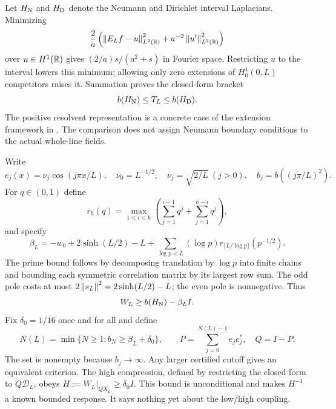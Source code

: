 Let $H_{\rm N}$ and $H_{\rm D}$ denote the Neumann and Dirichlet interval
Laplacians. Minimizing
\[
\frac2a\left(\left\lVert E_Lf-u\right\rVert_{L^2(\mathbb R)}^2+a^{-2}\left\lVert u'\right\rVert_{L^2(\mathbb R)}^2\right)
\]
over $u\in H^1(\mathbb R)$ gives $(2/a)s/(a^2+s)$ in Fourier space.
Restricting $u$ to the interval lowers this minimum; allowing only zero
extensions of $H_0^1(0,L)$ competitors raises it. Summation proves the
closed-form bracket
\begin{equation}\label{eq:bracket}
b(H_{\rm N})\le T_L\le b(H_{\rm D}).
\end{equation}
The positive resolvent representation is a concrete case of the extension
framework in \cite{KM}. The comparison does not assign Neumann boundary
conditions to the actual whole-line fields.

Write
\[
e_j(x)=\nu_j\cos(j\pi x/L),\quad
\nu_0=L^{-1/2},\quad\nu_j=\sqrt{2/L}\ (j>0),\quad
b_j=b((j\pi/L)^2).
\]
For $q\in(0,1)$ define
\[
r_h(q)=\max_{1\le i\le h}
\left(\sum_{j=1}^{i-1}q^j+\sum_{j=1}^{h-i}q^j\right),
\]
and specify
\begin{equation}\label{eq:beta}
\beta_L=-w_0+2\sinh(L/2)-L+
\sum_{\log p<L}(\log p)r_{\lceil L/\log p\rceil}(p^{-1/2}).
\end{equation}
The prime bound follows by decomposing translation by $\log p$ into finite
chains and bounding each symmetric correlation matrix by its largest row
sum. The odd pole costs at most $2\left\lVert s_L\right\rVert^2=2\sinh(L/2)-L$;
the even pole is nonnegative. Thus
\begin{equation}\label{eq:lower}
W_L\ge b(H_{\rm N})-\beta_LI.
\end{equation}
Fix $\delta_0=1/16$ once and for all and define
\begin{equation}\label{eq:N}
N(L)=\min\{N\ge1:b_N\ge\beta_L+\delta_0\},\qquad
P=\sum_{j=0}^{N(L)-1}e_je_j^*,\quad Q=I-P.
\end{equation}
The set is nonempty because $b_j\to\infty$. Any larger certified cutoff
gives an equivalent criterion. The high compression, defined by restricting
the closed form to $Q\mathcal D_L$, obeys $H:=W_L|_{QX_L}\ge\delta_0I$.
This bound is unconditional and makes $H^{-1}$ a known bounded response.
It says nothing yet about the low/high coupling.

